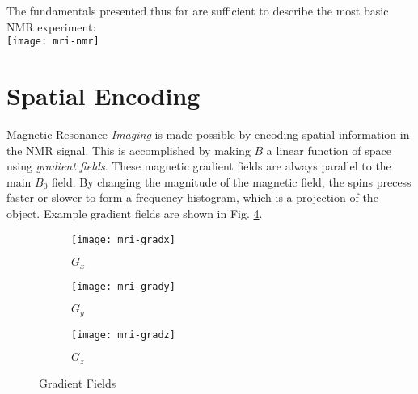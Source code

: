The fundamentals presented thus far are sufficient to describe the most basic NMR experiment:\\
{\centering
	\texttt{[image: mri-nmr]}
}

\section{Spatial Encoding}
Magnetic Resonance \textit{Imaging} is made possible by encoding spatial information in the NMR signal. This is accomplished by making $B$ a linear function of space using \textit{gradient fields}. These magnetic gradient fields are always parallel to the main $B_0$ field. By changing the magnitude of the magnetic field, the spins precess faster or slower to form a frequency histogram, which is a projection of the object. Example gradient fields are shown in Fig. \ref{fig:mri:gradients}.

\begin{figure}[h]
	\centering
	\begin{subfigure}[b]{0.3\textwidth}
		\centering
		\texttt{[image: mri-gradx]}
		\caption{$G_x$}
		\label{fig:mri:gradx}
	\end{subfigure}\hfill
	\begin{subfigure}[b]{0.3\textwidth}
		\centering
		\texttt{[image: mri-grady]}
		\caption{$G_y$}
		\label{fig:mri:grady}
	\end{subfigure}\hfill
	\begin{subfigure}[b]{0.3\textwidth}
		\centering
		\texttt{[image: mri-gradz]}
		\caption{$G_z$}
		\label{fig:mri:gradz}
	\end{subfigure}
	\caption{Gradient Fields}\label{fig:mri:gradients}
\end{figure} 

